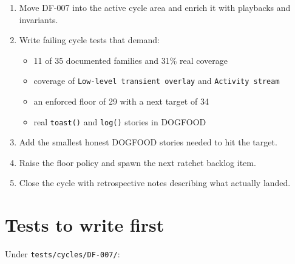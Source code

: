 \begin{enumerate}
\def\labelenumi{\arabic{enumi}.}
\tightlist
\item
  Move DF-007 into the active cycle area and enrich it with playbacks and invariants.
\item
  Write failing cycle tests that demand:

  \begin{itemize}
  \tightlist
  \item
    11 of 35 documented families and 31\% real coverage
  \item
    coverage of \texttt{L\allowbreak{}o\allowbreak{}w\allowbreak{}-\allowbreak{}l\allowbreak{}e\allowbreak{}v\allowbreak{}e\allowbreak{}l\allowbreak{} \allowbreak{}t\allowbreak{}r\allowbreak{}a\allowbreak{}n\allowbreak{}s\allowbreak{}i\allowbreak{}e\allowbreak{}n\allowbreak{}t\allowbreak{} \allowbreak{}o\allowbreak{}v\allowbreak{}e\allowbreak{}r\allowbreak{}l\allowbreak{}a\allowbreak{}y} and \texttt{A\allowbreak{}c\allowbreak{}t\allowbreak{}i\allowbreak{}v\allowbreak{}i\allowbreak{}t\allowbreak{}y\allowbreak{} \allowbreak{}s\allowbreak{}t\allowbreak{}r\allowbreak{}e\allowbreak{}a\allowbreak{}m}
  \item
    an enforced floor of 29 with a next target of 34
  \item
    real \texttt{t\allowbreak{}o\allowbreak{}a\allowbreak{}s\allowbreak{}t\allowbreak{}(\allowbreak{})} and \texttt{l\allowbreak{}o\allowbreak{}g\allowbreak{}(\allowbreak{})} stories in DOGFOOD
  \end{itemize}
\item
  Add the smallest honest DOGFOOD stories needed to hit the target.
\item
  Raise the floor policy and spawn the next ratchet backlog item.
\item
  Close the cycle with retrospective notes describing what actually landed.
\end{enumerate}

\section{Tests to write first}\label{record-069-tests-to-write-first}

Under \texttt{t\allowbreak{}e\allowbreak{}s\allowbreak{}t\allowbreak{}s\allowbreak{}/\allowbreak{}c\allowbreak{}y\allowbreak{}c\allowbreak{}l\allowbreak{}e\allowbreak{}s\allowbreak{}/\allowbreak{}D\allowbreak{}F\allowbreak{}-\allowbreak{}0\allowbreak{}0\allowbreak{}7\allowbreak{}/}:

